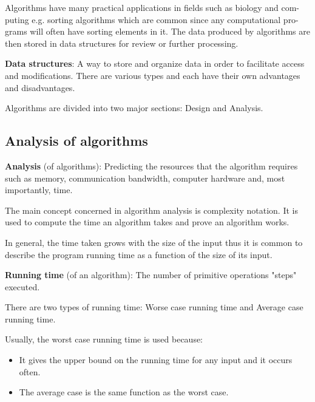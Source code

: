 \documentclass[10pt,a4paper]{article}
\begin{document}
Algorithms have many practical applications in ﬁelds such as biology and com-
puting e.g. sorting algorithms which are common since any computational pro-
grams will often have sorting elements in it. The data produced by algorithms
are then stored in data structures for review or further processing.

\begin{tcolorbox}[breakable,colback=white]
\textbf{Data structures}: A way to store and organize data in order to facilitate access and
modifications. There are various types and each have their own advantages and disadvantages.
\end{tcolorbox}

Algorithms are divided into two major sections: Design and Analysis.

\subsection{Analysis of algorithms}

\begin{tcolorbox}[breakable,colback=white]
\textbf{Analysis} (of algorithms): Predicting the resources that the algorithm requires such as
memory, communication bandwidth, computer hardware and, most importantly, time.
\end{tcolorbox}

The main concept concerned in algorithm analysis is complexity notation. It
is used to compute the time an algorithm takes and prove an algorithm works.

In general, the time taken grows with the size of the input thus it is common
to describe the program running time as a function of the size of its input.

\begin{tcolorbox}[breakable,colback=white]
\textbf{Running time} (of an algorithm): The number of primitive operations "steps" executed.
\end{tcolorbox}

There are two types of running time: Worse case running time and Average
case running time.

Usually, the worst case running time is used because:
\begin{itemize}
    \item It gives the upper bound on the running time for any input and it occurs
    often.
    \item The average case is the same function as the worst case.
\end{itemize}
\end{document}
